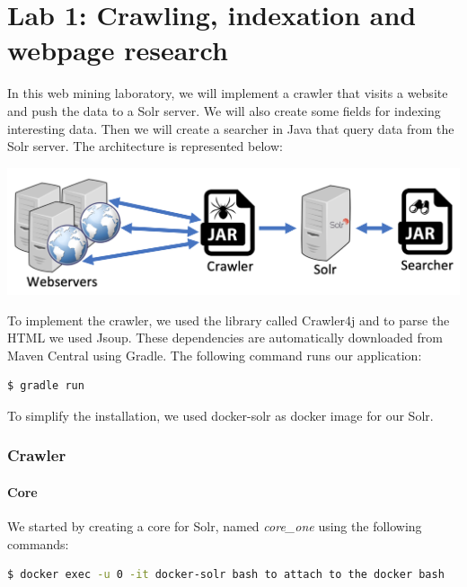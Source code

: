 \documentclass[a4paper]{article}
\begin{document}
\part*{Lab 1: Crawling, indexation and webpage research}
In this web mining laboratory, we will implement a crawler that visits a website and push the data to a Solr server. We will also create some fields for indexing interesting data. Then we will create a searcher in Java that query data from the Solr server. The architecture is represented below: \\

\begin{center}
	\includegraphics[scale=0.5]{architecture.png}
\end{center}

To implement the crawler, we used the library called Crawler4j and to parse the HTML we used Jsoup. These dependencies are automatically downloaded from Maven Central using Gradle. The following command runs our application: \\

\begin{lstlisting}[language=sh]
	$ gradle run
\end{lstlisting}

\vspace{6pt}

To simplify the installation, we used docker-solr as docker image for our Solr.

\section{Crawler}
\subsection{Core}
We started by creating a core for Solr, named \textit{core\_one} using the following commands:\\

\begin{lstlisting}[language=sh]
$ docker exec -u 0 -it docker-solr bash to attach to the docker bash
\end{lstlisting}
\end{document}
